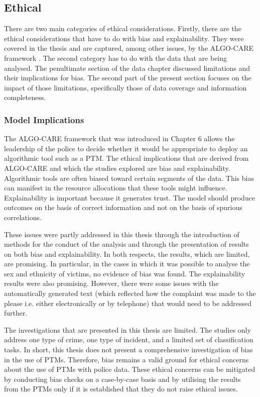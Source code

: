 \subsection{Ethical} There are two main categories of ethical considerations. Firstly, there are the ethical considerations that have to do with bias and explainability. They were covered in the thesis and are captured, among other issues, by the ALGO-CARE framework \parencite{oswald2018algorithmic}. The second category has to do with the data that are being analysed. The penultimate section of the data chapter discussed limitations and their implications for bias. The second part of the present section focuses on the impact of those limitations, specifically those of data coverage and information completeness.

\subsubsection{Model Implications}  The ALGO-CARE framework that was introduced in Chapter 6 allows the leadership of the police to decide whether it would be appropriate to deploy an algorithmic tool such as a PTM. The ethical implications that are derived from ALGO-CARE and which the studies explored are bias and explainability. Algorithmic tools are often biased toward certain segments of the data. This bias can manifest in the resource allocations that these tools might influence. Explainability is important because it generates trust. The model should produce outcomes on the basis of correct information and not on the basis of spurious correlations.  

These issues were partly addressed in this thesis through the introduction of methods for the conduct of the analysis and through the presentation of results on both bias and explainability. In both respects, the results, which are limited, are promising. In particular, in the cases in which it was possible to analyse the sex and ethnicity of victims, no evidence of bias was found. The explainability results were also promising. However, there were some issues with the automatically generated text (which reflected how the complaint was made to the please i.e. either electronically or by telephone)  that would need to be addressed further.

The investigations that are presented in this thesis are limited. The studies only address one type of crime, one type of incident, and a limited set of classification tasks. In short, this thesis does not present a comprehensive investigation of bias in the use of PTMs. Therefore, bias remains a valid ground for ethical concerns about the use of PTMs with police data. These ethical concerns can be mitigated by conducting bias checks on a case-by-case basis and by utilising the results from the PTMs only if it is established that they do not raise ethical issues.

